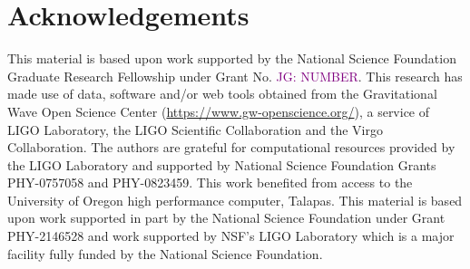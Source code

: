 \documentclass[twocolumn]{aastex631}
\newcommand{\jaxen}[1]{\textcolor{purple}{JG: #1}}
\begin{document}





\section{Acknowledgements}\label{sec:acknowledments}
This material is based upon work supported by the National Science Foundation Graduate Research Fellowship under Grant No. \jaxen{NUMBER}. This research has made use of data, software and/or web tools obtained from the Gravitational Wave Open Science Center 
(\url{https://www.gw-openscience.org/}), a service of LIGO Laboratory, the LIGO Scientific Collaboration and the Virgo Collaboration. 
The authors are grateful for computational resources provided by the LIGO Laboratory and supported by National Science Foundation Grants PHY-0757058 and PHY-0823459.  
This work benefited from access to the University of Oregon high performance computer, Talapas. This material is based upon work supported 
in part by the National Science Foundation under Grant PHY-2146528 and work supported by NSF's LIGO Laboratory which is a major facility 
fully funded by the National Science Foundation.
{}


\end{document}
